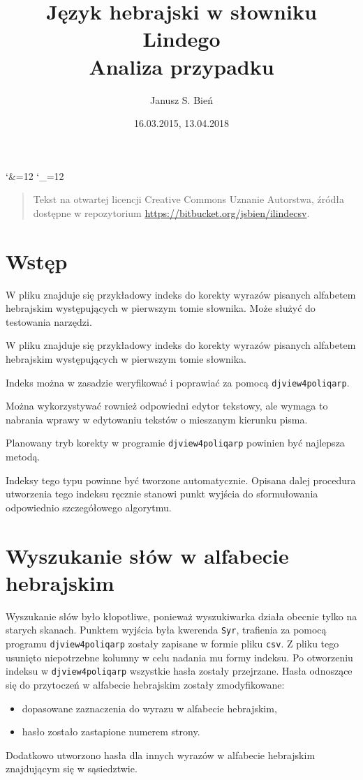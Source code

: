 \documentclass[12]{mwart}
\title{Język hebrajski w słowniku Lindego\\Analiza przypadku}
\author{Janusz S. Bień}
\date{16.03.2015, 13.04.2018}
\begin{document}
\maketitle

\catcode`\&=12
\catcode`\_=12

\begin{quote}
  Tekst na otwartej licencji Creative Commons Uznanie Autorstwa,
  źródła dostępne w repozytorium
  \url{https://bitbucket.org/jsbien/ilindecsv}.
\end{quote}

\section{Wstęp}
\label{sec:wstp}

W pliku  znajduje się przykładowy indeks do korekty
wyrazów pisanych alfabetem hebrajskim występujących w pierwszym tomie
słownika. Może służyć do testowania narzędzi.

W pliku  znajduje się przykładowy indeks do korekty
wyrazów pisanych alfabetem hebrajskim występujących w pierwszym tomie
słownika. 

Indeks można w zasadzie weryfikować i poprawiać za pomocą
\texttt{djview4poliqarp}.

Można wykorzystywać rownież odpowiedni edytor tekstowy, ale wymaga to
nabrania wprawy w edytowaniu tekstów o mieszanym kierunku pisma.

Planowany tryb korekty w programie \texttt{djview4poliqarp}
powinien być najlepsza metodą.

Indeksy tego typu powinne być tworzone automatycznie. Opisana dalej
procedura utworzenia tego indeksu ręcznie stanowi punkt wyjścia do
sformułowania odpowiednio szczegółowego algorytmu.

\section{Wyszukanie słów w alfabecie hebrajskim}
\label{sec:wyszukanie-sow-w}

Wyszukanie słów było kłopotliwe, ponieważ wyszukiwarka działa obecnie
tylko na starych skanach. Punktem wyjścia była kwerenda \texttt{Syr},
trafienia za pomocą programu \texttt{djview4poliqarp} zostały zapisane
w formie pliku \texttt{csv}. Z pliku tego usunięto niepotrzebne
kolumny w celu nadania mu formy indeksu. Po otworzeniu indeksu w
\texttt{djview4poliqarp} wszystkie hasła zostały przejrzane. Hasła
odnoszące się do przytoczeń w alfabecie hebrajskim zostały
zmodyfikowane:
\begin{itemize}
\item dopasowane zaznaczenia do wyrazu w alfabecie hebrajskim,
\item hasło zostało zastapione numerem strony.
\end{itemize}
Dodatkowo utworzono hasła dla innych wyrazów w alfabecie hebrajskim
znajdującym się w sąsiedztwie.
\end{document}
